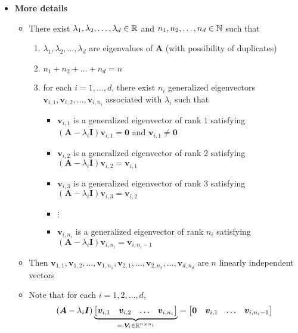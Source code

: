 \documentclass[12pt,a4paper]{article}
\begin{document}
\begin{itemize}
\item \textbf{More details}
  \begin{itemize}
  \item There exist $\lambda_{1},\lambda_{2},\ldots, \lambda_{d}\in \mathbb{R}$
    and
    $n_{1}, n_{2}, \ldots, n_{d} \in \mathbb{N}$
    such that
    \begin{enumerate}
    \item $\lambda_{1},\lambda_{2},\ldots, \lambda_{d}$ are eigenvalues of $\bm{A}$ (with possibility of duplicates)
    \item $n_{1} + n_{2} + \ldots + n_{d} = n$
    \item for each $i=1,\ldots, d$,
      there exist $n_{i}$ generalized eigenvectors $\bm{v}_{i,1}, \bm{v}_{i,2}, \ldots, \bm{v}_{i,n_{i}}$
      associated with $\lambda_{i}$
      such that
      \begin{itemize}
      \item $\bm{v}_{i,1}$ is a generalized eigenvector of rank $1$ satisfying $(\bm{A} - \lambda_{i}\bm{I})\bm{v}_{i,1}= \bm{0}$ and $\bm{v}_{i,1}\neq \bm{0}$
      \item $\bm{v}_{i,2}$ is a generalized eigenvector of rank $2$ satisfying $(\bm{A} - \lambda_{i}\bm{I})\bm{v}_{i,2} = \bm{v}_{i,1}$
      \item $\bm{v}_{i,3}$ is a generalized eigenvector of rank $3$ satisfying $(\bm{A} - \lambda_{i}\bm{I})\bm{v}_{i,3} = \bm{v}_{i,2}$
      \item[] $\vdots$
      \item $\bm{v}_{i,n_{i}}$ is a generalized eigenvector of rank $n_{i}$ satisfying $(\bm{A} - \lambda_{i}\bm{I})\bm{v}_{i,n_{i}} = \bm{v}_{i,n_{i}-1}$
      \end{itemize}
    \end{enumerate}
  \item Then $\bm{v}_{1,1},\bm{v}_{1,2},\ldots, \bm{v}_{1,n_{1}},\bm{v}_{2,1},\ldots, \bm{v}_{2,n_{2}},\ldots, \bm{v}_{d,n_{d}}$
    are $n$ linearly independent vectors
  \item Note that for each $i = 1, 2, \ldots, d$,
    \begin{equation}\nonumber%
      (\bm{A} - \lambda_{i}\bm{I})
      \underbrace{
      \begin{bmatrix}
        \bm{v}_{i,1} & \bm{v}_{i,2} & \ldots & \bm{v}_{i,n_{i}}
      \end{bmatrix}}_{=:\bm{V}_{i}\in \R^{n\times n_{i}}}
      =
      \begin{bmatrix}
        \bm{0} & \bm{v}_{i,1} & \ldots & \bm{v}_{i,n_{i}-1}

\end{bmatrix}
\end{equation}
\end{itemize}
\end{itemize}
\end{document}
